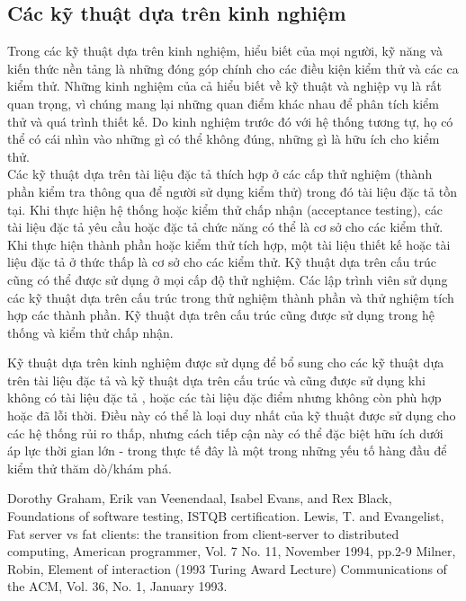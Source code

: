 \documentclass[11pt,a4paper,oneside]{article}
\begin{document}
\subsection {Các kỹ thuật dựa trên kinh nghiệm}
Trong các kỹ thuật dựa trên kinh nghiệm, hiểu biết của mọi người, kỹ năng và kiến thức nền tảng là những đóng góp chính cho các điều kiện kiểm thử và các ca kiểm thử. Những kinh nghiệm của cả hiểu biết về kỹ thuật và nghiệp vụ là rất quan trọng, vì chúng mang lại những quan điểm khác nhau để phân tích kiểm thử và quá trình thiết kế. Do kinh nghiệm trước đó với hệ thống tương tự, họ có thể có cái nhìn vào những gì có thể không đúng, những gì là hữu ích cho kiểm thử.\\

Các kỹ thuật  dựa trên tài liệu đặc tả thích hợp ở các cấp thử nghiệm (thành phần kiểm tra thông qua để người sử dụng kiểm thử) trong đó tài liệu đặc tả tồn tại. Khi thực hiện hệ thống hoặc kiểm thử chấp nhận (acceptance testing), các tài liệu đặc tả yêu cầu hoặc đặc tả chức năng có thể là cơ sở cho các kiểm thử. Khi thực hiện thành phần hoặc kiểm thử tích hợp, một tài liệu thiết kế hoặc tài liệu đặc tả ở thức thấp là cơ sở cho các kiểm thử.
Kỹ thuật dựa trên cấu trúc cũng có thể được sử dụng ở mọi cấp độ thử nghiệm. Các lập trình viên sử dụng các kỹ thuật dựa trên cấu trúc trong thử nghiệm thành phần và thử nghiệm tích hợp các thành phần. Kỹ thuật dựa trên cấu trúc cũng được sử dụng trong hệ thống và kiểm thử chấp nhận.

Kỹ thuật dựa trên kinh nghiệm được sử dụng để bổ sung cho các kỹ thuật dựa trên tài liệu đặc tả và kỹ thuật dựa trên cấu trúc và cũng được sử dụng khi không có tài liệu đặc tả , hoặc các tài liệu đặc điểm nhưng không còn phù hợp hoặc đã lỗi thời. Điều này có thể là loại duy nhất của kỹ thuật được sử dụng cho các hệ thống rủi ro thấp, nhưng cách tiếp cận này có thể đặc biệt hữu ích dưới áp lực thời gian lớn - trong thực tế đây là một trong những yếu tố hàng đầu để kiểm thử thăm dò/khám phá.

\begin{thebibliography}{9}
Dorothy Graham, Erik van Veenendaal, Isabel Evans, and Rex Black,
Foundations of software testing, ISTQB certification.
Lewis, T. and Evangelist,
Fat server vs fat clients: the transition from client-server to distributed computing,
American programmer, Vol. 7 No. 11, November 1994, pp.2-9
Milner, Robin,
Element of interaction (1993 Turing Award Lecture)
Communications of the ACM, Vol. 36, No. 1, January 1993.
\end{thebibliography}
\end{document}
